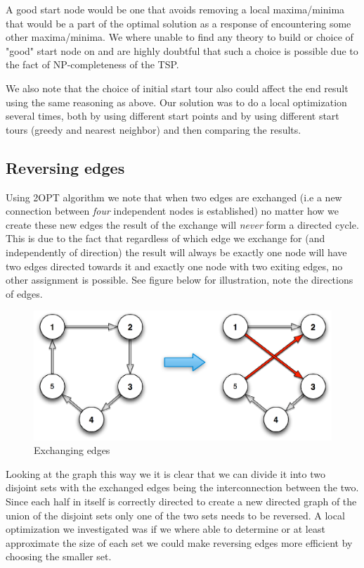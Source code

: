 \documentclass[a4paper,12pt,oneside]{article}
\begin{document}
A good start node would be one that avoids removing a local maxima/minima that would be a part of the optimal solution as a response of encountering some other maxima/minima. We where unable to find any theory to build or choice of "good" start node on and are highly doubtful that such a choice is possible due to the fact of NP-completeness of the TSP.

We also note that the choice of initial start tour also could affect the end result using the same reasoning as above. Our solution was to do a local optimization several times, both by using different start points and by using different start tours (greedy and nearest neighbor) and then comparing the results.

\subsection{Reversing edges}
Using 2OPT algorithm we note that when two edges are exchanged (i.e a new connection between \textit{four} independent nodes is established) no matter how we create these new edges the result of the exchange will \textit{never} form a directed cycle. This is due to the fact that regardless of which edge we exchange for (and independently of direction) the result will always be exactly one node will have two edges directed towards it and exactly one node with two exiting edges, no other assignment is possible. See figure below for illustration, note the directions of edges.

\begin{figure}[h]
	\begin{center}
		\includegraphics[width=0.90\linewidth]{rev_edge_graph.eps}
	\end{center}
	\caption{Exchanging edges}
	\label{exchange}
\end{figure}


Looking at the graph this way we it is clear that we can divide it into two disjoint sets with the exchanged edges being the interconnection between the two. Since each half in itself is correctly directed to create a new directed graph of the union of the disjoint sets only one of the two sets needs to be reversed. A local optimization we investigated was if we where able to determine or at least approximate the size of each set we could make reversing edges more efficient by choosing the smaller set. 
\end{document}
